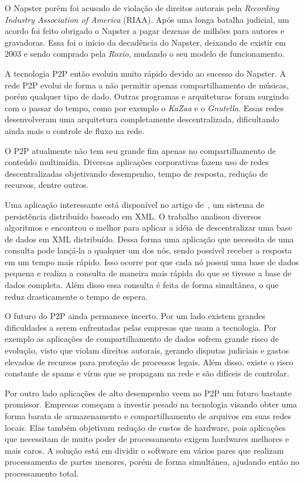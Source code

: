 O Napster porém foi acusado de violação de direitos autorais pela \emph{Recording Industry Association of America} (RIAA). Após uma longa batalha judicial, um acordo foi feito obrigado o Napster a pagar dezenas de milhões para autores e gravadoras. Essa foi o início da decadência do Napster, deixando de existir em 2003 e sendo comprado pela \emph{Roxio}, mudando o seu modelo de funcionamento.

A tecnologia P2P então evoluiu muito rápido devido ao sucesso do Napster. A rede P2P evolui de forma a não permitir apenas compartilhamento de músicas, porém qualquer tipo de dado. Outras programas e arquiteturas foram surgindo com o passar do tempo, como por exemplo o \emph{{K}a{Z}aa} e o \emph{Gnutella}. Essas redes desenvolveram uma arquitetura completamente descentralizada, dificultando ainda mais o controle de fluxo na rede.

O P2P atualmente não tem seu grande fim apenas no compartilhamento de conteúdo multimídia. Diversas aplicações corporativas fazem uso de redes descentralizadas objetivando desempenho, tempo de resposta, redução de recursos, dentre outros.

Uma aplicação interessante está disponível no artigo de~\cite{stilling03}, um sistema de persistência distribuído baseado em XML. O trabalho analisou diversos algoritmos e encontrou o melhor para aplicar a idéia de descentralizar uma base de dados em XML distribuído. Dessa forma uma aplicação que necessita de uma consulta pode lançá-la a qualquer um dos nós, sendo possível receber a resposta em um tempo mais rápido. Isso ocorre por que cada nó possui uma base de dados pequena e realiza a consulta de maneira mais rápida do que se tivesse a base de dados completa. Além disso essa consulta é feita de forma simultânea, o que reduz drasticamente o tempo de espera.

O futuro do P2P ainda permanece incerto. Por um lado existem grandes dificuldades a serem enfrentadas pelas empresas que usam a tecnologia. Por exemplo as aplicações de compartilhamento de dados sofrem grande risco de evolução, visto que violam direitos autorais, gerando disputas judiciais e gastos elevados de recursos para proteção de processos legais. Além disso, existe o risco constante de spams e vírus que se propagam na rede e são difíceis de controlar.

Por outro lado aplicações de alto desempenho veem no P2P um futuro bastante promissor. Empresas começam a investir pesado na tecnologia visando obter uma forma barata de armazenamento e compartilhamento de arquivos em suas redes locais. Elas também objetivam redução de custos de hardware, pois aplicações que necessitam de muito poder de processamento exigem hardwares melhores e mais caros. A solução está em dividir o software em vários pares que realizam processamento de partes menores, porém de forma simultânea, ajudando então no processamento total.

